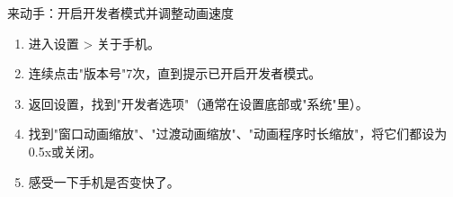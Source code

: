 \begin{tcbpractice}{来动手：开启开发者模式并调整动画速度}
\begin{enumerate}
  \item 进入设置 > 关于手机。
  \item 连续点击"版本号"7次，直到提示已开启开发者模式。
  \item 返回设置，找到"开发者选项"（通常在设置底部或"系统"里）。
  \item 找到"窗口动画缩放"、"过渡动画缩放"、"动画程序时长缩放"，将它们都设为0.5x或关闭。
  \item 感受一下手机是否变快了。
\end{enumerate}

\end{tcbpractice}
